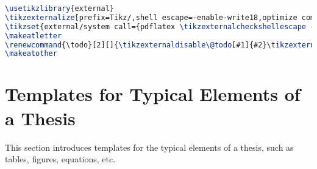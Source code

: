 		\begin{lstlisting}[breaklines, caption={Command lines for externalization in TikZ}, float=tbh, label={code:tikz_externalize}, language=latex]
\usetikzlibrary{external}
\tikzexternalize[prefix=Tikz/,shell escape=-enable-write18,optimize command away=]  
\tikzset{external/system call={pdflatex \tikzexternalcheckshellescape -halt-on-error -interaction=batchmode -jobname "\image" "\texsource"}}
\makeatletter
\renewcommand{\todo}[2][]{\tikzexternaldisable\@todo[#1]{#2}\tikzexternalenable}
\makeatother
		\end{lstlisting}
\section{Templates for Typical Elements of a Thesis}\label{sec:templates}
This section introduces templates for the typical elements of a thesis, such as tables, figures, equations, etc.

